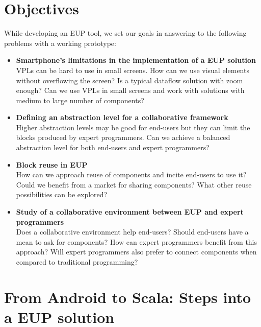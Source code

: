 \documentclass[9pt,a4paper]{extarticle}
\begin{document}
\begin{multicols}{2}
\section{Objectives}\label{sec:goals}

While developing an EUP tool, we set our goals in answering to the following problems with a working prototype:

\begin{itemize}
	\item{\textbf{Smartphone's limitations in the implementation of a EUP solution} \\
    VPLs can be hard to use in small screens. How can we use visual elements without overflowing the screen? Is a typical dataflow solution with zoom enough? Can we use VPLs in small screens and work with solutions with medium to large number of components?}
	
	\item{\textbf{Defining an abstraction level for a collaborative framework} \\
	Higher abstraction levels may be good for end-users but they can limit the blocks produced by expert programmers. Can we achieve a balanced abstraction level for both end-users and expert programmers?}
  
	\item{\textbf{Block reuse in EUP} \\
    How can we approach reuse of components and incite end-users to use it?
    Could we benefit from a market for sharing components? What other reuse possibilities can be explored?}
	
	\item{\textbf{Study of a collaborative environment between EUP and expert programmers} \\
    Does a collaborative environment help end-users? Should end-users have a mean to ask for components? How can expert programmers benefit from this approach? Will expert programmers also prefer to connect components when compared to traditional programming?}
\end{itemize}



\section{From Android to Scala: Steps into a EUP solution}\label{sec:work}


\end{multicols}
\end{document}
